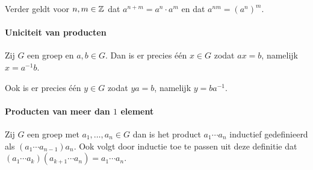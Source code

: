 Verder geldt voor \(n,m\in\mathbb{Z}\) dat \(a^{n+m}=a^{n}\cdot a^{m}\) en dat \(a^{nm}=(a^{n})^{m}\).

\paragraph{Uniciteit van producten} Zij \(G\) een groep en \(a,b\in G\). Dan is er precies één \(x\in G\) zodat \(ax=b\), namelijk \(x=a^{-1}b\).

Ook is er precies één \(y\in G\) zodat \(ya=b\), namelijk \(y=ba^{-1}\).

\paragraph{Producten van meer dan \(1\) element} Zij \(G\) een groep met \(a_{1},\dots,a_{n}\in G\) dan is het product \(a_{1}\cdots a_{n}\) inductief gedefinieerd als \((a_{1}\cdots a_{n-1})a_{n}\). Ook volgt door inductie toe te passen uit deze definitie dat \((a_{1}\cdots a_{k})(a_{k+1}\cdots a_{n})=a_{1}\cdots a_{n}\).